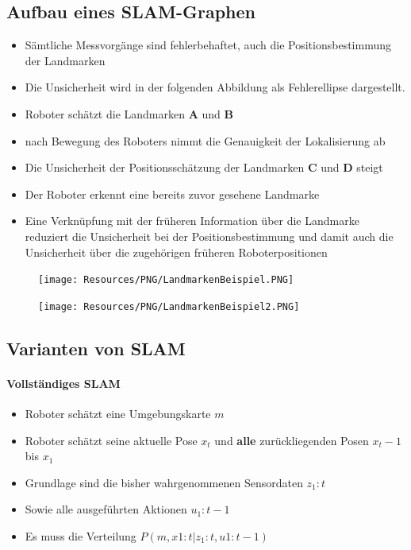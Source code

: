 \subsection{Aufbau eines SLAM-Graphen}
\begin{itemize}
	\item Sämtliche Messvorgänge sind fehlerbehaftet, auch die
		Positionsbestimmung der Landmarken
	\item Die Unsicherheit wird in der folgenden Abbildung als Fehlerellipse
		dargestellt.
	\item Roboter schätzt die Landmarken \textbf{A} und \textbf{B}
	\item nach Bewegung des Roboters nimmt die Genauigkeit der Lokalisierung ab
	\item Die Unsicherheit der Positionsschätzung der Landmarken \textbf{C} und
		\textbf{D} steigt
	\item Der Roboter erkennt eine bereits zuvor gesehene Landmarke
	\item Eine Verknüpfung mit der früheren Information über die Landmarke
		reduziert die Unsicherheit bei der Positionsbestimmung und damit auch die
		Unsicherheit über die zugehörigen früheren Roboterpositionen
\end{itemize}
\begin{minipage}[]{0.5\textwidth}
\begin{figure}[H]
	\begin{center}
		\texttt{[image: Resources/PNG/LandmarkenBeispiel.PNG]}
		\caption{}
		\label{fig:PNG/LandmarkenBeispiel.PNG}
	\end{center}
\end{figure}
\end{minipage}
\begin{minipage}[]{0.5\textwidth}
\begin{figure}[H]
	\begin{center}
		\texttt{[image: Resources/PNG/LandmarkenBeispiel2.PNG]}
		\caption{}
		\label{fig:PNG/LandmarkenBeispie2l.PNG}
	\end{center}
\end{figure}
\end{minipage}

\subsection{Varianten von SLAM}
\paragraph{Vollständiges SLAM}
\begin{itemize}
	\item Roboter schätzt eine Umgebungskarte $m$
	\item Roboter schätzt seine aktuelle Pose $x_t$ und \textbf{alle}
		zurückliegenden Posen $x_t-1$ bis $x_1$
	\item Grundlage sind die bisher wahrgenommenen Sensordaten $z_1:t$
	\item Sowie alle ausgeführten Aktionen $u_1:t-1$
	\item Es muss die Verteilung $P(m, x1:t | z_1:t, u1:t-1)$
\end{itemize}

